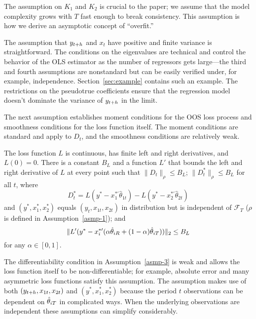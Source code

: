 \documentclass[12pt]{article}
\begin{document}
The assumption on $K_1$ and $K_2$ is crucial to the paper; we assume
that the model complexity grows with $T$ fast enough to break
consistency. This assumption is how we derive an asymptotic
concept of ``overfit.''

The assumption that $y_{t+h}$ and $x_t$ have positive and finite
variance is straightforward. The conditions on the eigenvalues are
technical and control the behavior of the OLS estimator as the number
of regressors gets large---the third and fourth assumptions are
nonstandard but can be easily verified under, for example,
independence. Section~\ref{sec:example} contains such an example. The
restrictions on the pseudotrue coefficients ensure that the regression
model doesn't dominate the variance of $y_{t+h}$ in the limit.

The next assumption establishes moment conditions for the OOS loss
process and smoothness conditions for the loss function itself. The
moment conditions are standard and apply to $D_t$, and the smoothness
conditions are relatively weak.

\begin{asmp}\label{asmp-3}
  The loss function $L$ is continuous, has finite left and right
  derivatives, and $L(0) = 0$.  There is a constant $B_L$ and a
  function $L'$ that bounds the left and right derivative of $L$ at
  every point such that $\|D_t\|_\rho \leq B_L$; $\|D_t^*\|_\rho \leq
  B_L$ for all $t$, where
  \begin{equation}
    D_t^* = L(y^* - x_1^{*\prime}\hat\theta_{1t})
    - L(y^* - x_2^{*\prime}\hat\theta_{2t})
  \end{equation}
  and $(y^*, x_1^*, x_2^*)$ equals $(y_t, x_{1t}, x_{2t})$ in
  distribution but is independent of $\mathcal{F}_T$ ($\rho$ is defined
  in Assumption~\ref{asmp-1}); and
  \begin{equation}\label{eq:29}
    \| L'(y^* - x_{i}^{*\prime} (\alpha \hat\theta_{iR} + (1-\alpha) \hat\theta_{iT})) \|_2
    \leq B_L
  \end{equation}
  for any $\alpha \in [0,1]$.
\end{asmp}

The differentiability condition in Assumption~\ref{asmp-3} is weak and
allows the loss function itself to be non-differentiable; for example,
absolute error and many asymmetric loss functions satisfy this
assumption. The assumption makes use of both $(y_{t+h}, x_{1t},
x_{2t})$ and $(y^*, x_1^*, x_2^*)$ because the period $t$ observations
can be dependent on $\hat\theta_{iT}$ in complicated ways. When the underlying
observations are independent these assumptions can simplify
considerably.
\end{document}
